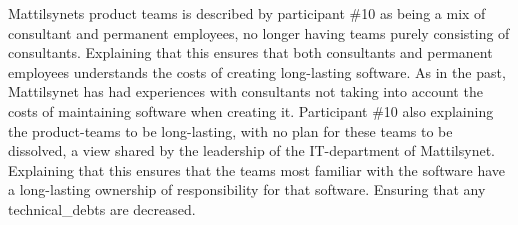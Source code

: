 
Mattilsynets product teams is described by participant \#10 as being a mix of consultant and permanent employees, no longer having teams purely consisting of consultants. Explaining that this ensures that both consultants and permanent employees understands the costs of creating long-lasting software. As in the past, Mattilsynet has had experiences with consultants not taking into account the costs of maintaining software when creating it. Participant \#10 also explaining the product-teams to be long-lasting, with no plan for these teams to be dissolved, a view shared by the leadership of the IT-department of Mattilsynet. Explaining that this ensures that the teams most familiar with the software have a long-lasting ownership of responsibility for that software. Ensuring that any \gls{technical_debt}s are decreased.



